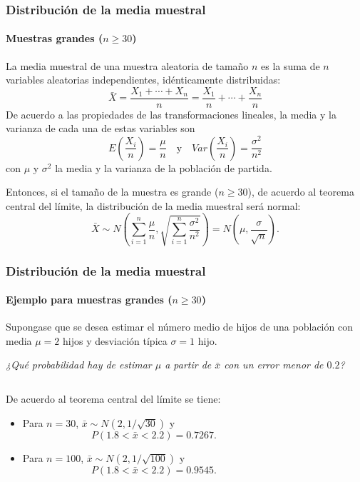 \begin{frame}
\frametitle{Distribución de la media muestral}
\framesubtitle{Muestras grandes ($n\geq 30$)}
La media muestral de una muestra aleatoria de tamaño $n$ es la suma de $n$ variables aleatorias independientes, idénticamente distribuidas:
\[
\bar X = \frac{X_1+\cdots+X_n}{n} = \frac{X_1}{n}+\cdots+\frac{X_n}{n}
\]
De acuerdo a las propiedades de las transformaciones lineales, la media y la varianza de cada una de estas variables son
\[
E\left(\frac{X_i}{n}\right) =\frac{\mu}{n} \quad  \mbox{y} \quad Var\left(\frac{X_i}{n}\right) = \frac{\sigma^2}{n^2}
\]
con $\mu$ y $\sigma^2$ la media y la varianza de la población de partida.

Entonces, si el tamaño de la muestra es grande ($n\geq 30$), de acuerdo al teorema central del límite, la distribución de la media muestral será normal:
\[
\bar X \sim N\left(\sum_{i=1}^n \frac{\mu}{n},\sqrt{\sum_{i=1}^n \frac{\sigma^2}{n^2}} \right) = N\left(\mu,\frac{\sigma}{\sqrt{n}} \right).
\]
\end{frame}


\begin{frame}
\frametitle{Distribución de la media muestral}
\framesubtitle{Ejemplo para muestras grandes ($n\geq 30$)}
Supongase que se desea estimar el número medio de hijos de una población con media $\mu=2$ hijos y desviación típica $\sigma=1$ hijo.
\begin{center}
\emph{¿Qué probabilidad hay de estimar $\mu$ a partir de $\bar x$ con un error menor de $0.2$?}
\end{center}
\begin{columns}
\begin{column}{0.5\textwidth}
De acuerdo al teorema central del límite se tiene:
\begin{itemize}
\item Para $n=30$, $\bar x\sim N(2,1/\sqrt{30})$ y
\[
P(1.8<\bar x<2.2) = 0.7267.
\]

\item Para $n=100$, $\bar x\sim N(2,1/\sqrt{100})$ y
\[
P(1.8<\bar x<2.2) = 0.9545.
\]
\end{itemize}
\end{column}
\begin{column}{0.5\textwidth}
\begin{center}
\resizebox{0.9\textwidth}{!}{}
\end{center}
\end{column}
\end{columns}
\end{frame}


